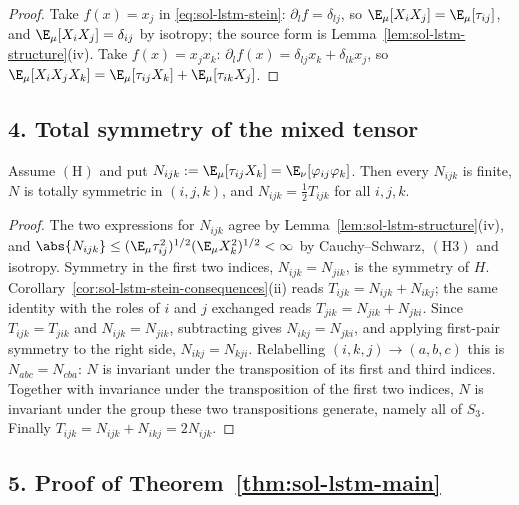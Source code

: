 \documentclass[../main.tex]{subfiles}
\begin{document}
\begin{proof}
Take $f(x)=x_j$ in \eqref{eq:sol-lstm-stein}: $\partial_lf=\delta_{lj}$, so
$\E_\mu[X_iX_j]=\E_\mu[\tau_{ij}]$, and $\E_\mu[X_iX_j]=\delta_{ij}$ by isotropy; the source
form is Lemma~\ref{lem:sol-lstm-structure}(iv).  Take $f(x)=x_jx_k$:
$\partial_lf(x)=\delta_{lj}x_k+\delta_{lk}x_j$, so
$\E_\mu[X_iX_jX_k]=\E_\mu[\tau_{ij}X_k]+\E_\mu[\tau_{ik}X_j]$.
\end{proof}

\subsection*{4. Total symmetry of the mixed tensor}

\begin{lemma}
\label{lem:sol-lstm-N}
Assume $(\mathrm H)$ and put $N_{ijk}:=\E_\mu[\tau_{ij}X_k]=\E_\nu[\varphi_{ij}\varphi_k]$.
Then every $N_{ijk}$ is finite, $N$ is totally symmetric in $(i,j,k)$, and
$N_{ijk}=\tfrac12T_{ijk}$ for all $i,j,k$.
\end{lemma}

\begin{proof}
The two expressions for $N_{ijk}$ agree by Lemma~\ref{lem:sol-lstm-structure}(iv), and
$\abs{N_{ijk}}\le(\E_\mu\tau_{ij}^2)^{1/2}(\E_\mu X_k^2)^{1/2}<\infty$ by Cauchy--Schwarz,
$(\mathrm H3)$ and isotropy.  Symmetry in the first two indices, $N_{ijk}=N_{jik}$, is the
symmetry of $H$.  Corollary~\ref{cor:sol-lstm-stein-consequences}(ii) reads
$T_{ijk}=N_{ijk}+N_{ikj}$; the same identity with the roles of $i$ and $j$ exchanged reads
$T_{jik}=N_{jik}+N_{jki}$.  Since $T_{ijk}=T_{jik}$ and $N_{ijk}=N_{jik}$, subtracting gives
$N_{ikj}=N_{jki}$, and applying first-pair symmetry to the right side, $N_{ikj}=N_{kji}$.
Relabelling $(i,k,j)\to(a,b,c)$ this is $N_{abc}=N_{cba}$: $N$ is invariant under the
transposition of its first and third indices.  Together with invariance under the transposition
of the first two indices, $N$ is invariant under the group these two transpositions generate,
namely all of $S_3$.  Finally $T_{ijk}=N_{ijk}+N_{ikj}=2N_{ijk}$.
\end{proof}

\subsection*{5. Proof of Theorem~\ref{thm:sol-lstm-main}}
\end{document}
